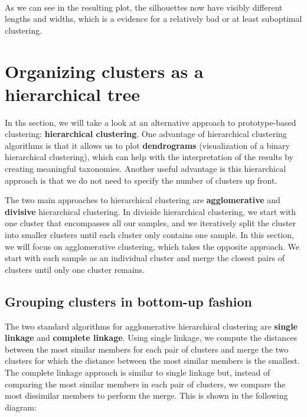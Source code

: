 \documentclass[11pt]{article}
\begin{document}
    \begin{center}
    \end{center}
    { \hspace*{\fill} \\}
    
    As we can see in the resulting plot, the silhouettes now have visibly
different lengths and widths, which is a evidence for a relatively bad
or at least suboptimal clustering.

    \section{Organizing clusters as a hierarchical
tree}\label{organizing-clusters-as-a-hierarchical-tree}

    In ths section, we will take a look at an alternative approach to
prototype-based clustering: \textbf{hierarchical clustering}. One
advantage of hierarchical clustering algorithms is that it allows us to
plot \textbf{dendrograms} (visualization of a binary hierarchical
clustering), which can help with the interpretation of the results by
creating meaningful taxonomies. Another useful advantage is this
hierarchical approach is that we do not need to specify the number of
clusters up front.

The two main approaches to hierarchical clustering are
\textbf{agglomerative} and \textbf{divisive} hierarchical clustering. In
diviside hierarchical clustering, we start with one cluster that
encompasses all our samples, and we iteratively split the cluster into
smaller clusters until each cluster only contains one sample. In this
section, we will focus on agglomerative clustering, which takes the
opposite approach. We start with each sample as an individual cluster
and merge the closest pairs of clusters until only one cluster remains.

    \subsection{Grouping clusters in bottom-up
fashion}\label{grouping-clusters-in-bottom-up-fashion}

    The two standard algorithms for agglomerative hierarchical clustering
are \textbf{single linkage} and \textbf{complete linkage}. Using single
linkage, we compute the distances between the most similar members for
each pair of clusters and merge the two clusters for which the distance
between the most similar members is the smallest. The complete linkage
approach is similar to single linkage but, instead of comparing the most
similar members in each pair of clusters, we compare the most dissimilar
members to perform the merge. This is shown in the following diagram:
\end{document}
